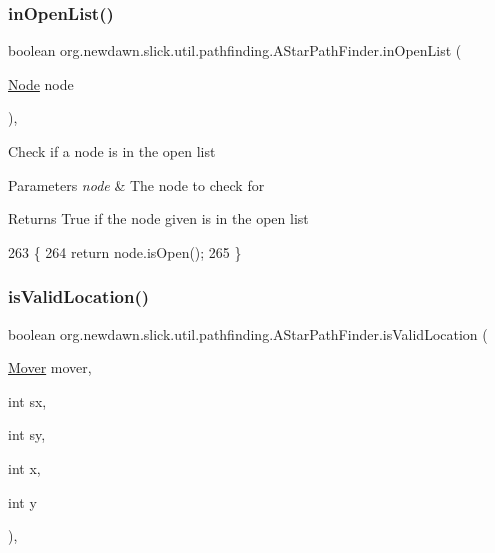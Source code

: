 \subsubsection{\texorpdfstring{in\+Open\+List()}{inOpenList()}}
{\footnotesize\ttfamily boolean org.\+newdawn.\+slick.\+util.\+pathfinding.\+A\+Star\+Path\+Finder.\+in\+Open\+List (\begin{DoxyParamCaption}\item[{\mbox{\hyperlink{classorg_1_1newdawn_1_1slick_1_1util_1_1pathfinding_1_1_a_star_path_finder_1_1_node}{Node}}}]{node }\end{DoxyParamCaption})\hspace{0.3cm}{\ttfamily [inline]}, {\ttfamily [protected]}}

Check if a node is in the open list


\begin{DoxyParams}{Parameters}
{\em node} & The node to check for \\
\hline
\end{DoxyParams}
\begin{DoxyReturn}{Returns}
True if the node given is in the open list 
\end{DoxyReturn}

\begin{DoxyCode}
263                                             \{
264         \textcolor{keywordflow}{return} node.isOpen();
265     \}
\end{DoxyCode}
\mbox{\label{classorg_1_1newdawn_1_1slick_1_1util_1_1pathfinding_1_1_a_star_path_finder_a815e6ff04646c49e3d0bacc2d06ee069}} 
\subsubsection{\texorpdfstring{is\+Valid\+Location()}{isValidLocation()}}
{\footnotesize\ttfamily boolean org.\+newdawn.\+slick.\+util.\+pathfinding.\+A\+Star\+Path\+Finder.\+is\+Valid\+Location (\begin{DoxyParamCaption}\item[{\mbox{\hyperlink{interfaceorg_1_1newdawn_1_1slick_1_1util_1_1pathfinding_1_1_mover}{Mover}}}]{mover,  }\item[{int}]{sx,  }\item[{int}]{sy,  }\item[{int}]{x,  }\item[{int}]{y }\end{DoxyParamCaption})\hspace{0.3cm}{\ttfamily [inline]}, {\ttfamily [protected]}}

